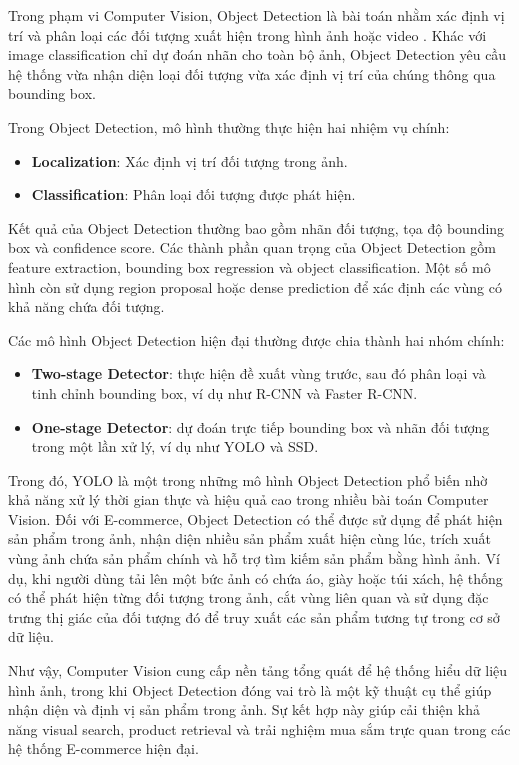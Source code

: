 Trong phạm vi Computer Vision, Object Detection là bài toán nhằm xác định vị trí và phân loại các đối tượng xuất hiện trong hình ảnh hoặc video \parencite{redmon2016yolo}. Khác với image classification chỉ dự đoán nhãn cho toàn bộ ảnh, Object Detection yêu cầu hệ thống vừa nhận diện loại đối tượng vừa xác định vị trí của chúng thông qua bounding box.

Trong Object Detection, mô hình thường thực hiện hai nhiệm vụ chính:
\begin{itemize}
    \item \textbf{Localization}: Xác định vị trí đối tượng trong ảnh.
    \item \textbf{Classification}: Phân loại đối tượng được phát hiện.
\end{itemize}

Kết quả của Object Detection thường bao gồm nhãn đối tượng, tọa độ bounding box và confidence score. Các thành phần quan trọng của Object Detection gồm feature extraction, bounding box regression và object classification. Một số mô hình còn sử dụng region proposal hoặc dense prediction để xác định các vùng có khả năng chứa đối tượng.

Các mô hình Object Detection hiện đại thường được chia thành hai nhóm chính:
\begin{itemize}
    \item \textbf{Two-stage Detector}: thực hiện đề xuất vùng trước, sau đó phân loại và tinh chỉnh bounding box, ví dụ như R-CNN và Faster R-CNN.
    \item \textbf{One-stage Detector}: dự đoán trực tiếp bounding box và nhãn đối tượng trong một lần xử lý, ví dụ như YOLO và SSD.
\end{itemize}

Trong đó, YOLO là một trong những mô hình Object Detection phổ biến nhờ khả năng xử lý thời gian thực và hiệu quả cao trong nhiều bài toán Computer Vision. Đối với E-commerce, Object Detection có thể được sử dụng để phát hiện sản phẩm trong ảnh, nhận diện nhiều sản phẩm xuất hiện cùng lúc, trích xuất vùng ảnh chứa sản phẩm chính và hỗ trợ tìm kiếm sản phẩm bằng hình ảnh. Ví dụ, khi người dùng tải lên một bức ảnh có chứa áo, giày hoặc túi xách, hệ thống có thể phát hiện từng đối tượng trong ảnh, cắt vùng liên quan và sử dụng đặc trưng thị giác của đối tượng đó để truy xuất các sản phẩm tương tự trong cơ sở dữ liệu.

Như vậy, Computer Vision cung cấp nền tảng tổng quát để hệ thống hiểu dữ liệu hình ảnh, trong khi Object Detection đóng vai trò là một kỹ thuật cụ thể giúp nhận diện và định vị sản phẩm trong ảnh. Sự kết hợp này giúp cải thiện khả năng visual search, product retrieval và trải nghiệm mua sắm trực quan trong các hệ thống E-commerce hiện đại.
